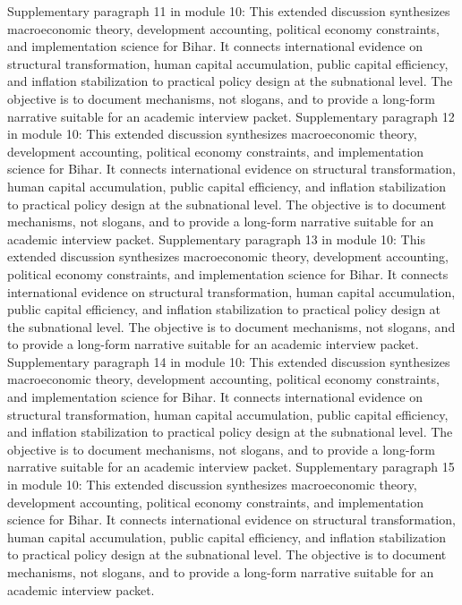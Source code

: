 \documentclass[preprint,12pt]{elsarticle}
\begin{document}
Supplementary paragraph 11 in module 10: This extended discussion synthesizes macroeconomic theory, development accounting, political economy constraints, and implementation science for Bihar. It connects international evidence on structural transformation, human capital accumulation, public capital efficiency, and inflation stabilization to practical policy design at the subnational level. The objective is to document mechanisms, not slogans, and to provide a long-form narrative suitable for an academic interview packet.
Supplementary paragraph 12 in module 10: This extended discussion synthesizes macroeconomic theory, development accounting, political economy constraints, and implementation science for Bihar. It connects international evidence on structural transformation, human capital accumulation, public capital efficiency, and inflation stabilization to practical policy design at the subnational level. The objective is to document mechanisms, not slogans, and to provide a long-form narrative suitable for an academic interview packet.
Supplementary paragraph 13 in module 10: This extended discussion synthesizes macroeconomic theory, development accounting, political economy constraints, and implementation science for Bihar. It connects international evidence on structural transformation, human capital accumulation, public capital efficiency, and inflation stabilization to practical policy design at the subnational level. The objective is to document mechanisms, not slogans, and to provide a long-form narrative suitable for an academic interview packet.
Supplementary paragraph 14 in module 10: This extended discussion synthesizes macroeconomic theory, development accounting, political economy constraints, and implementation science for Bihar. It connects international evidence on structural transformation, human capital accumulation, public capital efficiency, and inflation stabilization to practical policy design at the subnational level. The objective is to document mechanisms, not slogans, and to provide a long-form narrative suitable for an academic interview packet.
Supplementary paragraph 15 in module 10: This extended discussion synthesizes macroeconomic theory, development accounting, political economy constraints, and implementation science for Bihar. It connects international evidence on structural transformation, human capital accumulation, public capital efficiency, and inflation stabilization to practical policy design at the subnational level. The objective is to document mechanisms, not slogans, and to provide a long-form narrative suitable for an academic interview packet.
\end{document}
